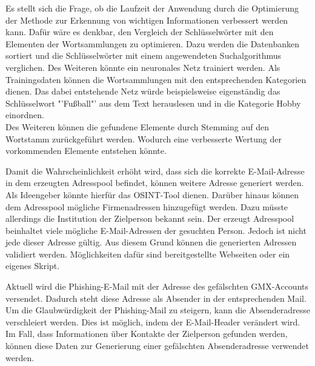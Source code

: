 Es stellt sich die Frage, ob die Laufzeit der Anwendung durch die Optimierung der Methode zur Erkennung von wichtigen Informationen verbessert werden kann. Dafür wäre es denkbar, den Vergleich der Schlüsselwörter mit den Elementen der Wortsammlungen zu optimieren. Dazu werden die Datenbanken sortiert und die Schlüsselwörter mit einem angewendeten Suchalgorithmus verglichen. Des Weiteren könnte ein neuronales Netz trainiert werden. Als Trainingsdaten können die Wortsammlungen mit den entsprechenden Kategorien dienen. Das dabei entstehende Netz würde beispielsweise eigenständig das Schlüsselwort "'Fußball"' aus dem Text herauslesen und in die Kategorie Hobby einordnen. \\
Des Weiteren können die gefundene Elemente durch Stemming auf den Wortstamm zurückgeführt werden. Wodurch eine verbesserte Wertung der vorkommenden Elemente entstehen könnte.

Damit die Wahrscheinlichkeit erhöht wird, dass sich die korrekte E-Mail-Adresse in dem erzeugten Adresspool befindet, können weitere Adresse generiert werden. Als Ideengeber könnte hierfür das OSINT-Tool \cite{EmailAssumptions} dienen. Darüber hinaus können dem Adresspool mögliche Firmenadressen hinzugefügt werden. Dazu müsste allerdings die Institution der Zielperson bekannt sein. Der erzeugt Adresspool beinhaltet viele mögliche E-Mail-Adressen der gesuchten Person. Jedoch ist nicht jede dieser Adresse gültig. Aus diesem Grund können die generierten Adressen validiert werden. Möglichkeiten dafür sind bereitgestellte Webseiten oder ein eigenes Skript.

Aktuell wird die Phishing-E-Mail mit der Adresse des gefälschten GMX-Accounts versendet. Dadurch steht diese Adresse als Absender in der entsprechenden Mail. Um die Glaubwürdigkeit der Phishing-Mail zu steigern, kann die Absenderadresse verschleiert werden. Dies ist möglich, indem der E-Mail-Header verändert wird. Im Fall, dass Informationen über Kontakte der Zielperson gefunden werden, können diese Daten zur Generierung einer gefälschten Absenderadresse verwendet werden.

